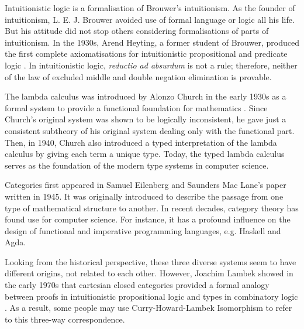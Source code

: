 Intuitionistic logic is a formalisation of Brouwer’s intuitionism. As the founder of intuitionism, L. E. J. Brouwer avoided use of formal language or logic all his life. But his attitude did not stop others considering formalisations of parts of intuitionism. In the 1930s, Arend Heyting, a former student of Brouwer, produced the first complete axiomatisations for intuitionistic propositional and predicate logic \cite{Rui91}. In intuitionistic logic, \emph{reductio ad absurdum} is not a rule; therefore, neither of the law of excluded middle and double negation elimination is provable.

The lambda calculus was introduced by Alonzo Church in the early 1930s as a formal system to provide a functional foundation for mathematics \cite{Bar85,Hin97}. Since Church's original system was shown to be logically inconsistent, he gave just a consistent subtheory of his original system dealing only with the functional part. Then, in 1940, Church also introduced a typed interpretation of the lambda calculus by giving each term a unique type. Today, the typed lambda calculus serves as the foundation of the modern type systems in computer science.

Categories first appeared in Samuel Eilenberg and Saunders Mac Lane's paper \cite{SS45} written in 1945. It was originally introduced to describe the passage from one type of mathematical structure to another. In recent decades, category theory has found use for computer science. For instance, it has a profound influence on the design of functional and imperative programming languages, e.g. Haskell and Agda.

Looking from the historical perspective, these three diverse systems seem to have different origins, not related to each other. However, Joachim Lambek showed in the early 1970s that cartesian closed categories provided a formal analogy between proofs in intuitionistic propositional logic and types in combinatory logic \cite{Lam72}. As a result, some people may use Curry-Howard-Lambek Isomorphism to refer to this three-way correspondence.